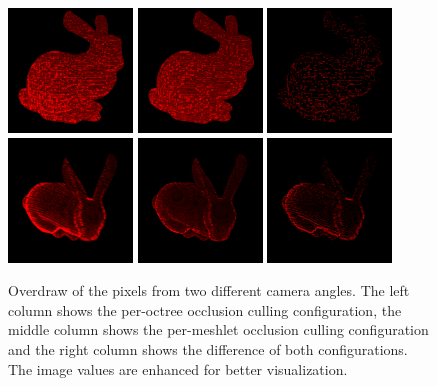 \begin{figure}[!htb]
  \centering
  \includegraphics[width=125px]{images/graphics/overdraw-bunny1-pooc.png}
  \includegraphics[width=125px]{images/graphics/overdraw-bunny1-pmoc.png}
  \includegraphics[width=125px]{images/graphics/overdraw-bunny1-diff.png}
  \includegraphics[width=125px]{images/graphics/overdraw-bunny2-pooc.png}
  \includegraphics[width=125px]{images/graphics/overdraw-bunny2-pmoc.png}
  \includegraphics[width=125px]{images/graphics/overdraw-bunny2-diff.png}
  \caption{Overdraw of the pixels from two different camera angles. The left column 
  shows the per-octree occlusion culling configuration, the middle column shows the 
  per-meshlet occlusion culling configuration and the right column shows the difference 
  of both configurations. The image values are enhanced for better visualization.}
  \label{fig:bunny-overdraw}
\end{figure}

